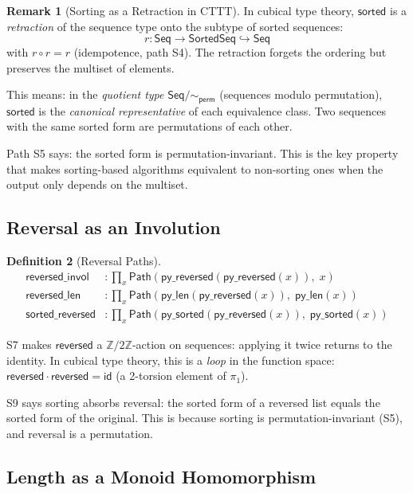 \documentclass[11pt,a4paper]{report}
\theoremstyle{definition}
\newtheorem{definition}{Definition}[chapter]
\newtheorem{remark}[definition]{Remark}
\theoremstyle{plain}
\newcommand{\Path}{\mathsf{Path}}
\newcommand{\Int}{\mathbb{Z}}
\begin{document}
\begin{remark}[Sorting as a Retraction in CTTT]
In cubical type theory, $\mathsf{sorted}$ is a \emph{retraction}
of the sequence type onto the subtype of sorted sequences:
\[
  r : \mathsf{Seq} \to \mathsf{SortedSeq} \hookrightarrow \mathsf{Seq}
\]
with $r \circ r = r$ (idempotence, path S4).  The retraction forgets
the ordering but preserves the multiset of elements.

This means: in the \emph{quotient type} $\mathsf{Seq}/\sim_\mathsf{perm}$
(sequences modulo permutation), $\mathsf{sorted}$ is the
\emph{canonical representative} of each equivalence class.  Two
sequences with the same sorted form are permutations of each other.

Path S5 says: the sorted form is permutation-invariant.  This is the
key property that makes sorting-based algorithms equivalent to
non-sorting ones when the output only depends on the multiset.
\end{remark}

\subsection{Reversal as an Involution}

\begin{definition}[Reversal Paths]
\begin{align}
  \mathsf{reversed\_invol} &: \prod_x
    \Path(\mathsf{py\_reversed}(\mathsf{py\_reversed}(x)),\; x)
    \tag{S7} \\
  \mathsf{reversed\_len} &: \prod_x
    \Path(\mathsf{py\_len}(\mathsf{py\_reversed}(x)),\;
          \mathsf{py\_len}(x))
    \tag{S8} \\
  \mathsf{sorted\_reversed} &: \prod_x
    \Path(\mathsf{py\_sorted}(\mathsf{py\_reversed}(x)),\;
          \mathsf{py\_sorted}(x))
    \tag{S9}
\end{align}
\end{definition}

S7 makes $\mathsf{reversed}$ a $\Int/2\Int$-action on sequences:
applying it twice returns to the identity.  In cubical type theory,
this is a \emph{loop} in the function space:
$\mathsf{reversed} \cdot \mathsf{reversed} = \mathsf{id}$ (a
2-torsion element of $\pi_1$).

S9 says sorting absorbs reversal: the sorted form of a reversed list
equals the sorted form of the original.  This is because sorting
is permutation-invariant (S5), and reversal is a permutation.

\subsection{Length as a Monoid Homomorphism}
\end{document}
